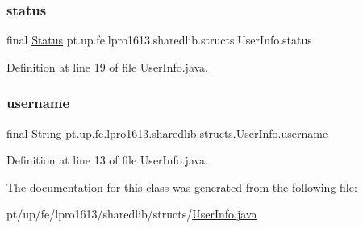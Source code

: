 \hypertarget{classpt_1_1up_1_1fe_1_1lpro1613_1_1sharedlib_1_1structs_1_1_user_info_a553ddd0c6e2695e0384a102b046cda02}{}\label{classpt_1_1up_1_1fe_1_1lpro1613_1_1sharedlib_1_1structs_1_1_user_info_a553ddd0c6e2695e0384a102b046cda02} 
\subsubsection{\texorpdfstring{status}{status}}
{\footnotesize\ttfamily final \hyperlink{enumpt_1_1up_1_1fe_1_1lpro1613_1_1sharedlib_1_1structs_1_1_user_info_1_1_status}{Status} pt.\+up.\+fe.\+lpro1613.\+sharedlib.\+structs.\+User\+Info.\+status}



Definition at line 19 of file User\+Info.\+java.

\hypertarget{classpt_1_1up_1_1fe_1_1lpro1613_1_1sharedlib_1_1structs_1_1_user_info_ac52ffa24c15ec39902b3fd840bb445f1}{}\label{classpt_1_1up_1_1fe_1_1lpro1613_1_1sharedlib_1_1structs_1_1_user_info_ac52ffa24c15ec39902b3fd840bb445f1} 
\subsubsection{\texorpdfstring{username}{username}}
{\footnotesize\ttfamily final String pt.\+up.\+fe.\+lpro1613.\+sharedlib.\+structs.\+User\+Info.\+username}



Definition at line 13 of file User\+Info.\+java.



The documentation for this class was generated from the following file\+:\begin{DoxyCompactItemize}
\item 
pt/up/fe/lpro1613/sharedlib/structs/\hyperlink{_user_info_8java}{User\+Info.\+java}\end{DoxyCompactItemize}
